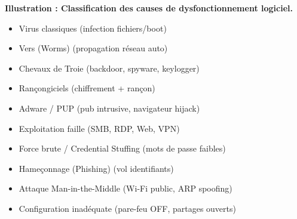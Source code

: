\documentclass[11pt]{article}
\begin{document}
\textbf{Illustration : Classification des causes de dysfonctionnement logiciel.}\par

\begin{popfigure}
\begin{center}\end{center}
\vspace{-2pt}
\begin{tcbraster}[raster columns=2,raster equal height=rows,raster column skip=6pt,raster row skip=6pt,enhanced,blankest]
\begin{tcolorbox}[enhanced,colback=white,colframe=poporange,boxrule=0.9pt,arc=3pt,title={Virus \& Malwares},fonttitle=\bfseries\scriptsize,coltitle=white,colbacktitle=poporange,left=4pt,right=4pt,top=2pt,bottom=2pt,boxsep=1pt,toptitle=1.5pt,bottomtitle=1.5pt,halign=left]
\begin{itemize}[nosep,leftmargin=*,itemsep=1pt,font=\scriptsize]
\item Virus classiques (infection fichiers/boot)
\item Vers (Worms) (propagation réseau auto)
\item Chevaux de Troie (backdoor, spyware, keylogger)
\item Rançongiciels (chiffrement + rançon)
\item Adware / PUP (pub intrusive, navigateur hijack)
\end{itemize}
\end{tcolorbox}
\begin{tcolorbox}[enhanced,colback=white,colframe=popgreen,boxrule=0.9pt,arc=3pt,title={Intrusions Réseau},fonttitle=\bfseries\scriptsize,coltitle=white,colbacktitle=popgreen,left=4pt,right=4pt,top=2pt,bottom=2pt,boxsep=1pt,toptitle=1.5pt,bottomtitle=1.5pt,halign=left]
\begin{itemize}[nosep,leftmargin=*,itemsep=1pt,font=\scriptsize]
\item Exploitation faille (SMB, RDP, Web, VPN)
\item Force brute / Credential Stuffing (mots de passe faibles)
\item Hameçonnage (Phishing) (vol identifiants)
\item Attaque Man-in-the-Middle (Wi-Fi public, ARP spoofing)
\item Configuration inadéquate (pare-feu OFF, partages ouverts)
\end{itemize}

\end{tcolorbox}
\end{tcbraster}
\end{popfigure}
\end{document}
